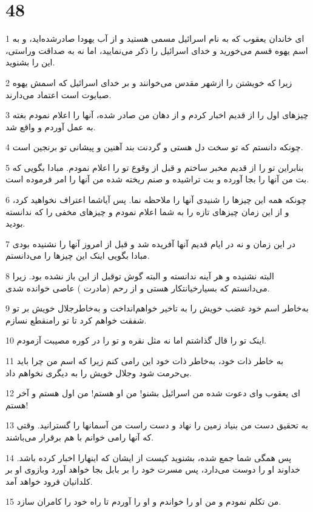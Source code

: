 \chapter{48}

\par 1 ای خاندان یعقوب که به نام اسرائیل مسمی هستید و از آب یهودا صادرشده‌اید، و به اسم یهوه قسم می‌خورید و خدای اسرائیل را ذکر می‌نمایید، اما نه به صداقت وراستی، این را بشنوید.
\par 2 زیرا که خویشتن را ازشهر مقدس می‌خوانند و بر خدای اسرائیل که اسمش یهوه صبایوت است اعتماد می‌دارند.
\par 3 چیزهای اول را از قدیم اخبار کردم و از دهان من صادر شده، آنها را اعلام نمودم بغته به عمل آوردم و واقع شد.
\par 4 چونکه دانستم که تو سخت دل هستی و گردنت بند آهنین و پیشانی تو برنجین است.
\par 5 بنابراین تو را از قدیم مخبر ساختم و قبل از وقوع تو را اعلام نمودم. مبادا بگویی که بت من آنها را بجا آورده و بت تراشیده و صنم ریخته شده من آنها را امر فرموده است.
\par 6 چونکه همه این چیزها را شنیدی آنها را ملاحظه نما. پس آیاشما اعتراف نخواهید کرد، و از این زمان چیزهای تازه را به شما اعلام نمودم و چیزهای مخفی را که ندانسته بودید.
\par 7 در این زمان و نه در ایام قدیم آنها آفریده شد و قبل از امروز آنها را نشنیده بودی مبادا بگویی اینک این چیزها را می‌دانستم.
\par 8 البته نشنیده و هر آینه ندانسته و البته گوش توقبل از این باز نشده بود. زیرا می‌دانستم که بسیارخیانتکار هستی و از رحم (مادرت ) عاصی خوانده شدی.
\par 9 به‌خاطر اسم خود غضب خویش را به تاخیر خواهم‌انداخت و به‌خاطرجلال خویش بر تو شفقت خواهم کرد تا تو رامنقطع نسازم.
\par 10 اینک تو را قال گذاشتم اما نه مثل نقره و تو را در کوره مصیبت آزمودم.
\par 11 به خاطر ذات خود، به‌خاطر ذات خود این رامی کنم زیرا که اسم من چرا باید بی‌حرمت شود وجلال خویش را به دیگری نخواهم داد.
\par 12 ‌ای یعقوب و‌ای دعوت شده من اسرائیل بشنو! من او هستم! من اول هستم و آخر هستم!
\par 13 به تحقیق دست من بنیاد زمین را نهاد و دست راست من آسمانها را گسترانید. وقتی که آنها رامی خوانم با هم برقرار می‌باشند.
\par 14 پس همگی شما جمع شده، بشنوید کیست از ایشان که اینهارا اخبار کرده باشد. خداوند او را دوست می‌دارد، پس مسرت خود را بر بابل بجا خواهد آورد وبازوی او بر کلدانیان فرود خواهد آمد.
\par 15 من تکلم نمودم و من او را خواندم و او را آوردم تا راه خود را کامران سازد.

